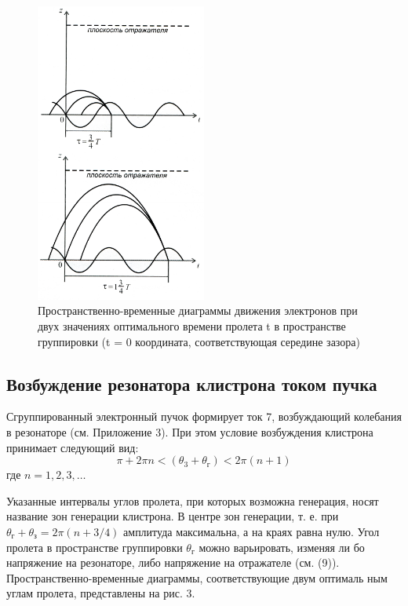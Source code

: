 \begin{figure}[h!]
	\centering
	\includegraphics[width=0.5\textwidth]{fig/fig3}
	\caption{Пространственно-временные диаграммы движения электронов при двух значени­ях оптимального времени пролета t в пространстве группировки (t = 0 координата,
соответствующая середине зазора)}
	\label{fig:3}
\end{figure}


\subsection{Возбуждение резонатора клистрона током пучка}
Сгруппированный электронный пучок формирует ток 7, возбуждающий
колебания в резонаторе (см. Приложение 3). При этом условие возбуждения
клистрона принимает следующий вид:
\begin{equation}
	\pi + 2 \pi n < \left( \theta _ { 3 } + \theta _ { \text{г} } \right) < 2 \pi ( n + 1 )
\end{equation}где $n=1,2,3,\dots $

Указанные интервалы углов пролета, при которых возможна генерация,
носят название зон генерации клистрона. В центре зон генерации, т. е. при
$\theta _ { \text{г} } + \theta _ { \text{з} } = 2 \pi ( n + 3 / 4 )$ амплитуда максимальна, а на краях равна нулю. Угол
пролета в пространстве группировки $\theta _ { \text{г} }$ можно варьировать, изменяя ли­
бо напряжение на резонаторе, либо напряжение на отражателе (см. (9)).
Пространственно-временные диаграммы, соответствующие двум оптималь­
ным углам пролета, представлены на рис. 3.

